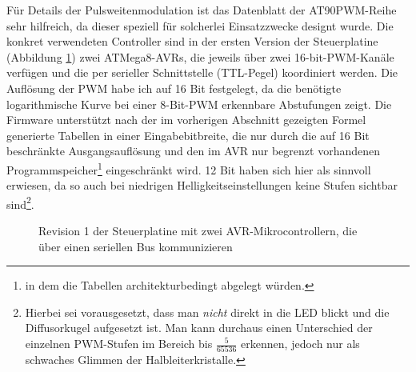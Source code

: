 \documentclass[12pt,a4paper,notitlepage]{article}
\begin{document}
Für Details der Pulsweitenmodulation ist das Datenblatt der AT90PWM-Reihe sehr hilfreich, da dieser speziell für solcherlei Einsatzzwecke designt wurde\cite{ATMEL2}. Die konkret verwendeten Controller sind in der ersten Version der Steuerplatine (Abbildung \ref{controller_rev1}) zwei ATMega8-AVRs, die jeweils über zwei 16-bit-PWM-Kanäle verfügen und die per serieller Schnittstelle (TTL-Pegel) koordiniert werden. Die Auflösung der PWM habe ich auf 16 Bit festgelegt, da die benötigte logarithmische Kurve bei einer 8-Bit-PWM erkennbare Abstufungen zeigt. Die Firmware unterstützt nach der im vorherigen Abschnitt %
gezeigten Formel generierte Tabellen in einer Eingabebitbreite, die nur durch die auf 16 Bit beschränkte Ausgangsauflösung und den im AVR nur begrenzt vorhandenen Programmspeicher\footnote{in dem die Tabellen architekturbedingt abgelegt würden.} eingeschränkt wird. 12 Bit haben sich hier als sinnvoll erwiesen, da so auch bei %
niedrigen Helligkeitseinstellungen keine Stufen sichtbar sind\footnote{Hierbei sei vorausgesetzt, dass man \emph{nicht} direkt in die LED blickt und die Diffusorkugel aufgesetzt ist. Man kann durchaus einen Unterschied der einzelnen PWM-Stufen im Bereich bis $\frac{5}{65536}$ erkennen, jedoch nur als schwaches Glimmen der Halbleiterkristalle.}.	

\begin{figure}
\centering
{}
\caption{Revision 1 der Steuerplatine mit zwei AVR-Mikrocontrollern, die über einen seriellen Bus kommunizieren}
\label{controller_rev1}
\end{figure}
\end{document}
